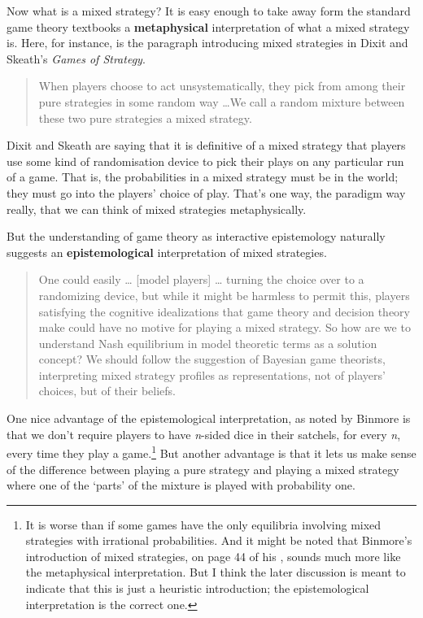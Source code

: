 \documentclass[
  11pt,
]{book}
\begin{document}
Now what is a mixed strategy? It is easy enough to take away form the standard game theory textbooks a \textbf{metaphysical} interpretation of what a mixed strategy is. Here, for instance, is the paragraph introducing mixed strategies in Dixit and Skeath's \emph{Games of Strategy}.

\begin{quote}
When players choose to act unsystematically, they pick from among their pure strategies in some random way \ldots We call a random mixture between these two pure strategies a mixed strategy. \citep[ 186]{DixitSkeath2004}
\end{quote}

Dixit and Skeath are saying that it is definitive of a mixed strategy that players use some kind of randomisation device to pick their plays on any particular run of a game. That is, the probabilities in a mixed strategy must be in the world; they must go into the players' choice of play. That's one way, the paradigm way really, that we can think of mixed strategies metaphysically.

But the understanding of game theory as interactive epistemology naturally suggests an \textbf{epistemological} interpretation of mixed strategies.

\begin{quote}
One could easily \ldots{} {[}model players{]} \ldots{} turning the choice over to a randomizing device, but while it might be harmless to permit this, players satisfying the cognitive idealizations that game theory and decision theory make could have no motive for playing a mixed strategy. So how are we to understand Nash equilibrium in model theoretic terms as a solution concept? We should follow the suggestion of Bayesian game theorists, interpreting mixed strategy profiles as representations, not of players' choices, but of their beliefs. \citep[ 57-8]{Stalnaker1994}
\end{quote}

One nice advantage of the epistemological interpretation, as noted by Binmore \citeyearpar[ 185]{Binmore2007} is that we don't require players to have \emph{n}-sided dice in their satchels, for every \emph{n}, every time they play a game.\footnote{It is worse than if some games have the only equilibria involving mixed strategies with irrational probabilities. And it might be noted that Binmore's introduction of mixed strategies, on page 44 of his \citeyearpar{Binmore2007}, sounds much more like the metaphysical interpretation. But I think the later discussion is meant to indicate that this is just a heuristic introduction; the epistemological interpretation is the correct one.} But another advantage is that it lets us make sense of the difference between playing a pure strategy and playing a mixed strategy where one of the `parts' of the mixture is played with probability one.
\end{document}
